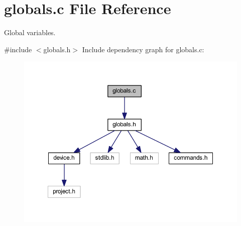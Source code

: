 \section{globals.\+c File Reference}
\label{globals_8c}


Global variables.  


{\ttfamily \#include $<$globals.\+h$>$}\newline
Include dependency graph for globals.\+c\+:\nopagebreak
\begin{figure}[H]
\begin{center}
\leavevmode
\includegraphics[width=350pt]{globals_8c__incl}
\end{center}
\end{figure}
